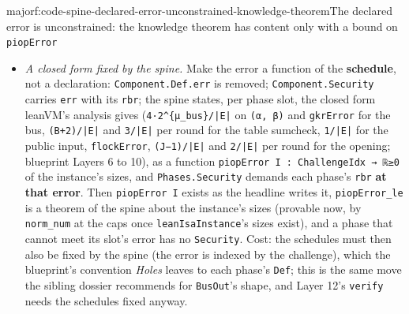 \begin{finding}{major}{f:code-spine-declared-error-unconstrained-knowledge-theorem}{The declared error is unconstrained: the knowledge theorem has content only with a bound on \texttt{piopError}}
\begin{itemize}
\item \emph{A closed form fixed by the spine.} Make the error a function of the \textbf{schedule}, not a declaration: \texttt{Component.\allowbreak{}Def.\allowbreak{}err} is removed; \texttt{Component.\allowbreak{}Security} carries \texttt{err} with its \texttt{rbr}; the spine states, per phase slot, the closed form leanVM's analysis gives (\texttt{4·2\textasciicircum{}\{μ\_\allowbreak{}bus\}/\allowbreak{}|E|} on \texttt{(\allowbreak{}α,\allowbreak{} β)} and \texttt{gkrError} for the bus, \texttt{(\allowbreak{}B+2)/\allowbreak{}|E|} and \texttt{3/\allowbreak{}|E|} per round for the table sumcheck, \texttt{1/\allowbreak{}|E|} for the public input, \texttt{flockError}, \texttt{(\allowbreak{}J−1)/\allowbreak{}|E|} and \texttt{2/\allowbreak{}|E|} per round for the opening; blueprint Layers 6 to 10), as a function \texttt{p\allowbreak{}i\allowbreak{}o\allowbreak{}p\allowbreak{}E\allowbreak{}r\allowbreak{}r\allowbreak{}o\allowbreak{}r\allowbreak{} I\allowbreak{} :\allowbreak{} C\allowbreak{}h\allowbreak{}a\allowbreak{}l\allowbreak{}l\allowbreak{}e\allowbreak{}n\allowbreak{}g\allowbreak{}e\allowbreak{}I\allowbreak{}d\allowbreak{}x\allowbreak{} →\allowbreak{} ℝ\allowbreak{}≥\allowbreak{}0} of the instance's sizes, and \texttt{Phases.\allowbreak{}Security} demands each phase's \texttt{rbr} \textbf{at that error}. Then \texttt{piopError I} exists as the headline writes it, \texttt{piopError\_\allowbreak{}le} is a theorem of the spine about the instance's sizes (provable now, by \texttt{norm\_\allowbreak{}num} at the caps once \texttt{leanIsaInstance}'s sizes exist), and a phase that cannot meet its slot's error has no \texttt{Security}. Cost: the schedules must then also be fixed by the spine (the error is indexed by the challenge), which the blueprint's convention \emph{Holes} leaves to each phase's \texttt{Def}; this is the same move the sibling dossier recommends for \texttt{BusOut}'s shape, and Layer 12's \texttt{verify} needs the schedules fixed anyway.
\end{itemize}


\end{finding}
